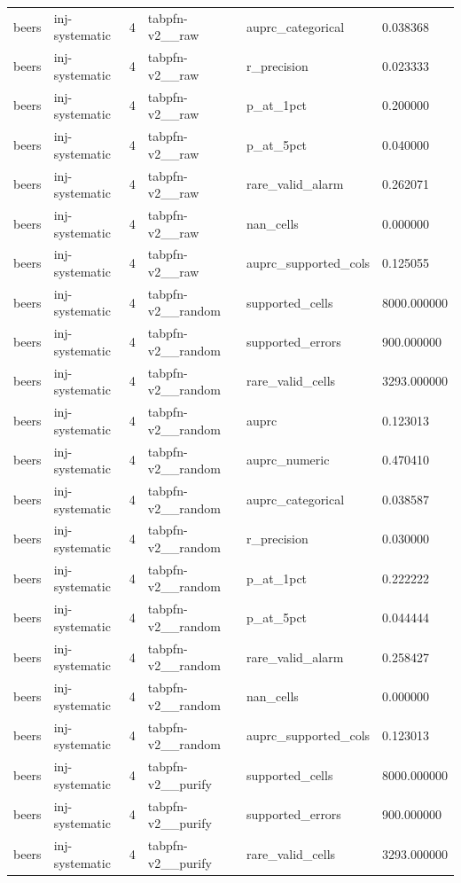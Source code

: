 \begin{tabular}{llllll}
beers & inj-systematic & 4 & tabpfn-v2\_\_raw & auprc\_categorical & 0.038368 \\
beers & inj-systematic & 4 & tabpfn-v2\_\_raw & r\_precision & 0.023333 \\
beers & inj-systematic & 4 & tabpfn-v2\_\_raw & p\_at\_1pct & 0.200000 \\
beers & inj-systematic & 4 & tabpfn-v2\_\_raw & p\_at\_5pct & 0.040000 \\
beers & inj-systematic & 4 & tabpfn-v2\_\_raw & rare\_valid\_alarm & 0.262071 \\
beers & inj-systematic & 4 & tabpfn-v2\_\_raw & nan\_cells & 0.000000 \\
beers & inj-systematic & 4 & tabpfn-v2\_\_raw & auprc\_supported\_cols & 0.125055 \\
beers & inj-systematic & 4 & tabpfn-v2\_\_random & supported\_cells & 8000.000000 \\
beers & inj-systematic & 4 & tabpfn-v2\_\_random & supported\_errors & 900.000000 \\
beers & inj-systematic & 4 & tabpfn-v2\_\_random & rare\_valid\_cells & 3293.000000 \\
beers & inj-systematic & 4 & tabpfn-v2\_\_random & auprc & 0.123013 \\
beers & inj-systematic & 4 & tabpfn-v2\_\_random & auprc\_numeric & 0.470410 \\
beers & inj-systematic & 4 & tabpfn-v2\_\_random & auprc\_categorical & 0.038587 \\
beers & inj-systematic & 4 & tabpfn-v2\_\_random & r\_precision & 0.030000 \\
beers & inj-systematic & 4 & tabpfn-v2\_\_random & p\_at\_1pct & 0.222222 \\
beers & inj-systematic & 4 & tabpfn-v2\_\_random & p\_at\_5pct & 0.044444 \\
beers & inj-systematic & 4 & tabpfn-v2\_\_random & rare\_valid\_alarm & 0.258427 \\
beers & inj-systematic & 4 & tabpfn-v2\_\_random & nan\_cells & 0.000000 \\
beers & inj-systematic & 4 & tabpfn-v2\_\_random & auprc\_supported\_cols & 0.123013 \\
beers & inj-systematic & 4 & tabpfn-v2\_\_purify & supported\_cells & 8000.000000 \\
beers & inj-systematic & 4 & tabpfn-v2\_\_purify & supported\_errors & 900.000000 \\
beers & inj-systematic & 4 & tabpfn-v2\_\_purify & rare\_valid\_cells & 3293.000000 \\

\end{tabular}
